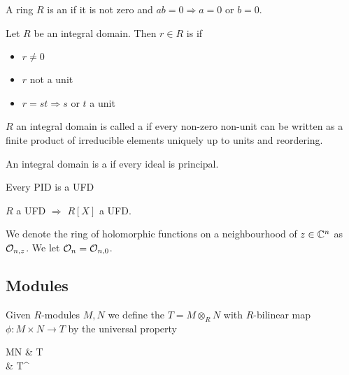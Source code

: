 \documentclass{article}
\begin{document}
\begin{definition}
	A ring $R$ is an  if it is not zero and $ab=0 \Rightarrow a=0$ or $b=0$. 
\end{definition}

\begin{definition}
	Let $R$ be an integral domain. Then $r\in R$ is  if
	\begin{itemize}
		\item $r \neq 0$
		\item $r$ not a unit
		\item $r=st \Rightarrow s$ or $t$ a unit
	\end{itemize}
\end{definition}

\begin{definition}
	$R$ an integral domain is called a  if every non-zero non-unit can be written as a finite product of irreducible elements uniquely up to units and reordering. 
\end{definition}

\begin{definition}
	An integral domain is a  if every ideal is principal. 
\end{definition}

\begin{prop}
	Every PID is a UFD
\end{prop}

\begin{prop}$R$ a UFD $\Rightarrow$ $R[X]$ a UFD. 
\end{prop}

\begin{notation}
	We denote the ring of holomorphic functions on a neighbourhood of $z \in \mathbb{C}^n$ as $\mathcal{O}_{n,z}$. We let $\mathcal{O}_n = \mathcal{O}_{n,0}$.
\end{notation}

\subsection{Modules}
\begin{definition}
	Given $R$-modules $M,N$ we define the  $T= M \otimes_R N$ with $R$-bilinear map $\phi:M\times N \to T$ by the universal property
	\begin{tkz}
		M\times N \arrow[r,"\phi"]  & T \\ & T^\prime  
	\end{tkz}
\end{definition}
\end{document}
